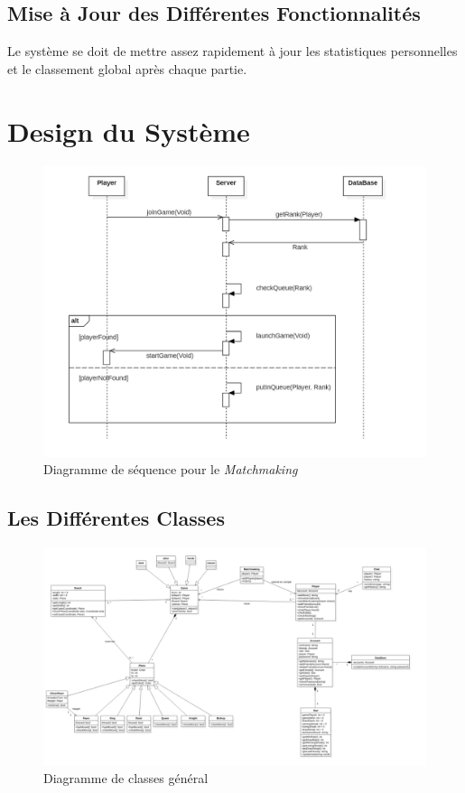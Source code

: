 \documentclass[10pt, a4paper]{article}
\begin{document}
\subsection{Mise à Jour des Différentes Fonctionnalités}
Le système se doit de mettre assez rapidement à jour les statistiques personnelles et le classement global après chaque partie.

\section{Design du Système}

\begin{figure}[ht]
\centering
\includegraphics[scale=0.72]{SequenceDiagramMatchmaking.PNG}
\caption{Diagramme de séquence pour le \textit{Matchmaking}}
\label{SD_matchmaker} %
\end{figure}
\subsection{Les Différentes Classes}

\begin{figure}
\includegraphics[scale=0.5]{ClassDiagram.png}
\caption{Diagramme de classes général}
\label{CD} %
\end{figure}
\end{document}
